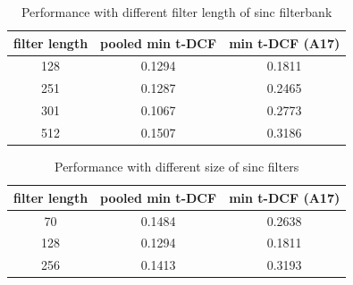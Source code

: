 
\begin{table}[!t]
	\centering

	\caption{Performance with different filter length of sinc filterbank}
  \setlength\tabcolsep{3pt}
	\begin{tabular}{|c| c| c|}
		\hline
		 filter length  & pooled min t-DCF& min t-DCF (A17) 	\\ 
	     \hline	
	     128&0.1294&0.1811\\
	     \hline
	     251&0.1287&0.2465\\
	     \hline
	     301&0.1067&0.2773\\
	     \hline
	     512&0.1507&0.3186\\
		 
		 \hline
		  
		   
	
	\end{tabular}
	\label{Tab:different filter length}
\end{table}


\begin{table}[!t]
	\centering

	\caption{Performance with different size of sinc filters}
  \setlength\tabcolsep{3pt}
	\begin{tabular}{|c| c| c|}
		\hline
		 filter length  & pooled min t-DCF& min t-DCF (A17) 	\\ 
		 \hline	
	     70&0.1484&0.2638\\
	     \hline	
	     128&0.1294&0.1811\\
	     \hline
	     256&0.1413&0.3193\\
		\hline
		  
		   
	
	\end{tabular}
	\label{Tab:different filter length}
	\vspace{-0.15cm}
\end{table}


